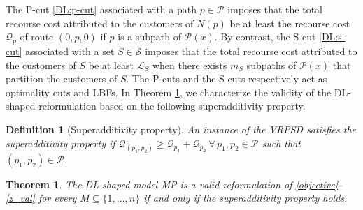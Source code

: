 \documentclass{article}
\newtheorem{theorem}{Theorem}
\newtheorem{definition}{Definition}
\newcommand{\rev}[1]{{\color{black}#1}}
\begin{document}
The P-cut \eqref{DL:p-cut} associated with a path $p \in \mathcal{P}$ imposes that the total recourse cost attributed to the customers of $N(p)$ be at least the recourse cost $\mathcal{Q}_p$ of route $(0,p,0)$ if $p$ is a subpath of $\mathcal{P}(x)$. By contrast, the S-cut \eqref{DL:s-cut} associated with a set $S \in \mathcal{S}$ imposes that the total recourse cost attributed to the customers of $S$ be at least $\mathcal{L}_S$ when there exists $m_S$ subpaths of $\mathcal{P}(x)$ that partition the customers of $S$. The P-cuts and the S-cuts respectively act as optimality cuts and LBFs. In Theorem \ref{thm:validity_DL-shaped}, we characterize the validity of the DL-shaped reformulation based on the following superadditivity property. 

\begin{definition}[Superadditivity property]\label{def:superadditivity}
    An instance of the VRPSD satisfies the superadditivity property if $\mathcal{Q}_{(p_1,p_2)}\geq\mathcal{Q}_{p_1}+\mathcal{Q}_{p_2} \ \forall\,p_1,p_2\in\mathcal P$ such that $(p_1,p_2) \in \mathcal{P}$.
\end{definition}

\begin{theorem}\label{thm:validity_DL-shaped}
\rev{The DL-shaped model MP is a valid reformulation of \eqref{objective}--\eqref{z_val} for every $M \subseteq \{1,\dots,n\}$} if and only if the superadditivity property holds.
\end{theorem}
\end{document}
